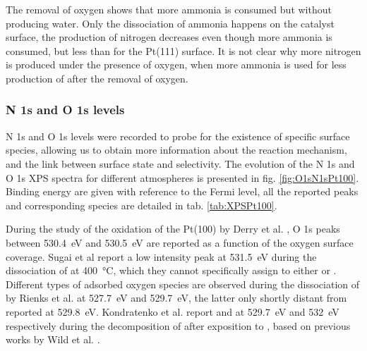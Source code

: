 The removal of oxygen shows that more ammonia is consumed but without producing water.
Only the dissociation of ammonia happens on the catalyst surface, the production of nitrogen decreases even though more ammonia is consumed, but less than for the Pt(111) surface.
It is not clear why more nitrogen is produced under the presence of oxygen, when more ammonia is used for less production of  after the removal of oxygen.

\subsubsection{N 1s and O 1s levels}

N 1s and O 1s levels were recorded to probe for the existence of specific surface species, allowing us to obtain more information about the reaction mechanism, and the link between surface state and selectivity.
The evolution of the N 1s and O 1s XPS spectra for different atmospheres is presented in fig. \ref{fig:O1sN1sPt100}.
Binding energy are given with reference to the Fermi level, all the reported peaks and corresponding species are detailed in tab. \ref{tab:XPSPt100}.

During the study of the oxidation of the Pt(100) by Derry et al. \parencite*{Derry1984}, O 1s peaks between \qty{530.4}{\eV} and \qty{530.5}{\eV} are reported as a function of the oxygen surface coverage.
Sugai et al \parencite*{Sugai1993} report a low intensity peak at \qty{531.5}{\eV} during the dissociation of  at \qty{400}{\degreeCelsius}, which they cannot specifically assign to either  or .
Different types of adsorbed oxygen species are observed during the dissociation of  by Rienks et al. \parencite*{Rienks2003} at \qty{527.7}{\eV} and \qty{529.7}{\eV}, the latter only shortly distant from  reported at \qty{529.8}{\eV}.
Kondratenko et al. \parencite*{Kondratenko2006} report  and  at \qty{529.7}{\eV} and \qty{532}{\eV} respectively during the decomposition of  after exposition to , based on previous works by Wild et al. \parencite*{Wild2000}.

